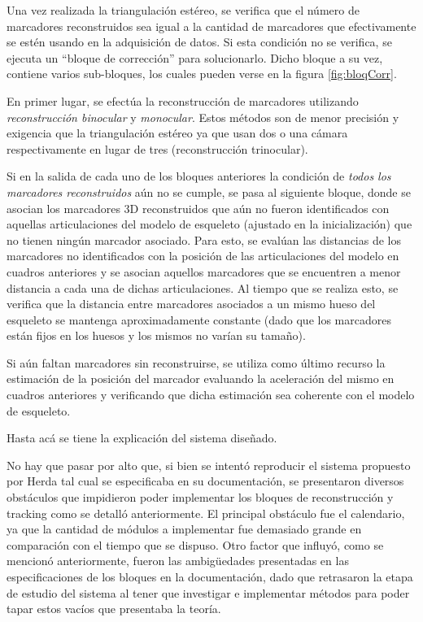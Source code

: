 Una vez realizada la triangulación estéreo, se verifica que el número de marcadores reconstruidos sea igual a la cantidad de marcadores que efectivamente se estén usando en la adquisición de datos. Si esta condición no se verifica, se ejecuta un “bloque de corrección” para solucionarlo. Dicho bloque a su vez, contiene  varios sub-bloques, los cuales pueden verse en la figura \ref{fig:bloqCorr}.

En primer lugar, se efectúa la reconstrucción de marcadores utilizando \emph{reconstrucción binocular} y \emph{monocular}. Estos métodos son de menor precisión y exigencia que la triangulación estéreo ya que usan dos o una cámara respectivamente en lugar de tres (reconstrucción trinocular).

 Si en la salida de cada uno de los bloques anteriores la condición de \emph{todos los marcadores reconstruidos} aún no se cumple, se pasa al siguiente bloque, donde se asocian los marcadores 3D reconstruidos que aún no fueron identificados con aquellas articulaciones del modelo de esqueleto (ajustado en la inicialización) que no tienen ningún marcador asociado. Para esto, se evalúan las distancias de los marcadores no identificados con la posición de las articulaciones del modelo en cuadros anteriores y se asocian aquellos marcadores que se encuentren a menor distancia a cada una de dichas articulaciones. Al tiempo que se realiza esto, se verifica que la distancia entre marcadores asociados a un mismo hueso del esqueleto se mantenga aproximadamente constante (dado que los marcadores están fijos en los huesos y los mismos no varían su tamaño).
 
Si aún faltan marcadores sin reconstruirse, se utiliza como último recurso la estimación de la posición del marcador evaluando la aceleración del mismo en cuadros anteriores y verificando que dicha estimación sea coherente con el modelo de esqueleto.


Hasta acá se tiene la explicación del sistema diseñado. 

No hay que pasar por alto que, si bien se intentó reproducir el sistema propuesto por Herda\cite{herda} tal cual se especificaba en su documentación, se presentaron diversos obstáculos que impidieron poder implementar los bloques de reconstrucción y tracking como se detalló anteriormente. El principal obstáculo fue el calendario, ya que la cantidad de módulos a implementar fue demasiado grande en comparación con el tiempo que se dispuso. Otro factor que influyó, como se mencionó anteriormente, fueron las ambigüedades presentadas en las especificaciones de los bloques en la documentación, dado que retrasaron la etapa de estudio del sistema al tener que investigar e implementar métodos para poder tapar estos vacíos que presentaba la teoría.

